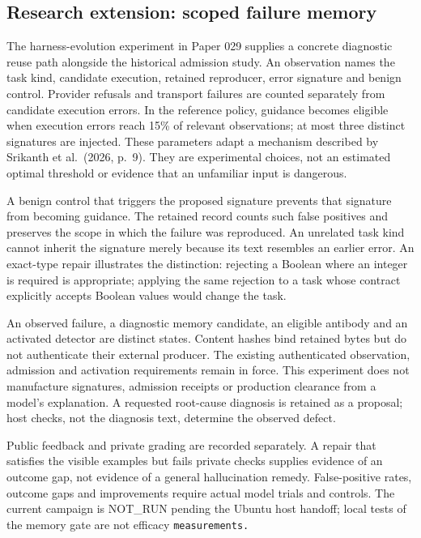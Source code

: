 \documentclass[
  11pt,
]{article}
\begin{document}
\subsection{Research extension: scoped failure
memory}\label{research-extension-scoped-failure-memory}

The harness-evolution experiment in Paper 029 supplies a concrete
diagnostic reuse path alongside the historical admission study. An
observation names the task kind, candidate execution, retained
reproducer, error signature and benign control. Provider refusals and
transport failures are counted separately from candidate execution
errors. In the reference policy, guidance becomes eligible when
execution errors reach 15\% of relevant observations; at most three
distinct signatures are injected. These parameters adapt a mechanism
described by Srikanth et al.~(2026, p.~9). They are experimental
choices, not an estimated optimal threshold or evidence that an
unfamiliar input is dangerous.

A benign control that triggers the proposed signature prevents that
signature from becoming guidance. The retained record counts such false
positives and preserves the scope in which the failure was reproduced.
An unrelated task kind cannot inherit the signature merely because its
text resembles an earlier error. An exact-type repair illustrates the
distinction: rejecting a Boolean where an integer is required is
appropriate; applying the same rejection to a task whose contract
explicitly accepts Boolean values would change the task.

An observed failure, a diagnostic memory candidate, an eligible antibody
and an activated detector are distinct states. Content hashes bind
retained bytes but do not authenticate their external producer. The
existing authenticated observation, admission and activation
requirements remain in force. This experiment does not manufacture
signatures, admission receipts or production clearance from a model's
explanation. A requested root-cause diagnosis is retained as a proposal;
host checks, not the diagnosis text, determine the observed defect.

Public feedback and private grading are recorded separately. A repair
that satisfies the visible examples but fails private checks supplies
evidence of an outcome gap, not evidence of a general hallucination
remedy. False-positive rates, outcome gaps and improvements require
actual model trials and controls. The current campaign is NOT\_RUN
pending the Ubuntu host handoff; local tests of the memory gate are not
efficacy \nolinkurl{measurements.}
\end{document}
